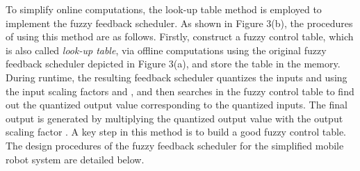 \documentclass[12pt,a4paper]{ijicic}
\begin{document}
To simplify online computations, the look-up table method is
employed to implement the fuzzy feedback scheduler. As shown in
Figure 3(b), the procedures of using this method are as follows.
Firstly, construct a fuzzy control table, which is also called \emph{look-up
table}, via offline computations using the original fuzzy feedback
scheduler depicted in Figure 3(a), and store the table in the
memory. During runtime, the resulting feedback scheduler quantizes
the inputs  and  using the input scaling factors 
and , and then searches in the fuzzy control table to find out
the quantized output value corresponding to the quantized inputs.
The final output  is generated by multiplying the quantized
output value with the output scaling factor . A key step in
this method is to build a good fuzzy control table. The design
procedures of the fuzzy feedback scheduler for the simplified mobile
robot system are detailed below.
\end{document}
